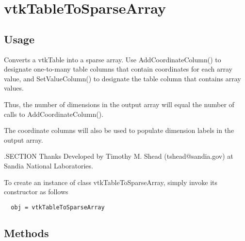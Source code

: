 \section{vtkTableToSparseArray}

\subsection{Usage}

 Converts a vtkTable into a sparse array.  Use AddCoordinateColumn() to
 designate one-to-many table columns that contain coordinates for each
 array value, and SetValueColumn() to designate the table column that 
 contains array values.

 Thus, the number of dimensions in the output array will equal the number
 of calls to AddCoordinateColumn().

 The coordinate columns will also be used to populate dimension labels
 in the output array.

 .SECTION Thanks
 Developed by Timothy M. Shead (tshead@sandia.gov) at Sandia National Laboratories.

To create an instance of class vtkTableToSparseArray, simply
invoke its constructor as follows
\begin{verbatim}
  obj = vtkTableToSparseArray
\end{verbatim}
\subsection{Methods}


